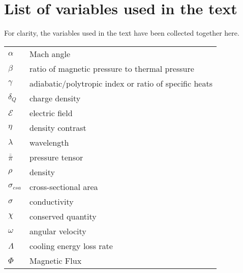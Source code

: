 \chapter{List of variables used in the text}
For clarity, the variables used in the text have been collected together here.
\begin{longtable}{l l}
$\alpha$ & Mach angle \\
$\beta$ & ratio of magnetic pressure to thermal pressure \\
$\gamma$  &  adiabatic/polytropic index or ratio of specific heats\\
$\delta_Q$  &  charge density \\
$\mathcal{E}$  &  electric field \\
$\eta$  &  density contrast \\
$\lambda$  &  wavelength\\
$\overline{\overline{\pi}}$  &  pressure tensor\\
$\rho$  &  density\\
$\sigma_{csa}$  & cross-sectional area\\
$\sigma$  & conductivity\\
$\chi$  & conserved quantity\\
$\omega$  &  angular velocity\\
$\Lambda$  &  cooling energy loss rate\\
$\Phi$ & Magnetic Flux\\

\end{longtable}
